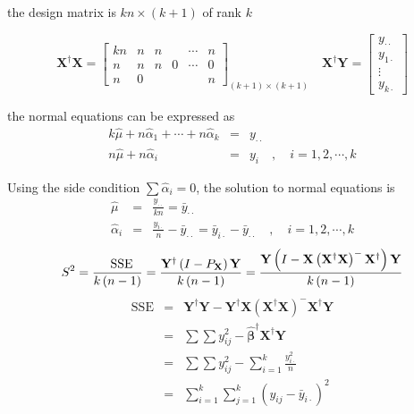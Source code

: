 \documentclass{article}
\begin{document}
the design matrix is $kn\times \left( k+1\right) $ of rank $k$

\begin{equation*}
\mathbf{X}^{\dagger }\mathbf{X}=\left[ 
\begin{array}{cccccc}
kn & n & n &  & \cdots & n \\ 
n & n & n & 0 & \cdots & 0 \\ 
n & 0 &  &  &  & n%
\end{array}%
\right] _{\left( k+1\right) \times \left( k+1\right) }\quad \mathbf{X}%
^{\dagger }\mathbf{Y}=\left[ 
\begin{array}{c}
y_{\cdot \cdot } \\ 
y_{1\cdot } \\ 
\vdots \\ 
y_{k\cdot }%
\end{array}%
\right]
\end{equation*}

\bigskip

the normal equations can be expressed as%
\begin{eqnarray*}
k\hat{\mu}+n\hat{\alpha}_{1}+\cdots +n\hat{\alpha}_{k} &=&y_{\cdot \cdot } \\
n\hat{\mu}+n\hat{\alpha}_{i} &=&y_{i}\quad ,\quad i=1,2,\cdots ,k
\end{eqnarray*}

Using the side condition $\sum \hat{\alpha}_{i}=0$, the solution to normal
equations is%
\begin{eqnarray*}
\hat{\mu} &=&\frac{y_{\cdot \cdot }}{kn}=\bar{y}_{\cdot \cdot } \\
\hat{\alpha}_{i} &=&\frac{y_{i\cdot }}{n}-\bar{y}_{\cdot \cdot }=\bar{y}%
_{i\cdot }-\bar{y}_{\cdot \cdot }\quad ,\quad i=1,2,\cdots ,k
\end{eqnarray*}%
\begin{equation*}
S^{2}=\frac{\text{SSE}}{k\left( n-1\right) }=\frac{\mathbf{Y}^{\dagger
}\left( I-P_{\mathbf{X}}\right) \mathbf{Y}}{k\left( n-1\right) }=\frac{%
\mathbf{Y}\left( I-\mathbf{X}\left( \mathbf{X}^{\dagger }\mathbf{X}\right)
^{-}\mathbf{X}^{\dagger }\right) \mathbf{Y}}{k\left( n-1\right) }
\end{equation*}%
\begin{eqnarray*}
\text{SSE} &=&\mathbf{Y}^{\dagger }\mathbf{Y-Y}^{\dagger }\mathbf{X}\left( 
\mathbf{X}^{\dagger }\mathbf{X}\right) ^{-}\mathbf{X}^{\dagger }\mathbf{Y} \\
&=&\sum \sum y_{ij}^{2}-\mathbf{\hat{\beta}}^{\dagger }\mathbf{X}^{\dagger }%
\mathbf{Y} \\
&=&\sum \sum y_{ij}^{2}-\sum_{i=1}^{k}\frac{y_{i\cdot }^{2}}{n} \\
&=&\sum_{i=1}^{k}\sum_{j=1}^{k}\left( y_{ij}-\bar{y}_{i\cdot }\right) ^{2}
\end{eqnarray*}
\end{document}
